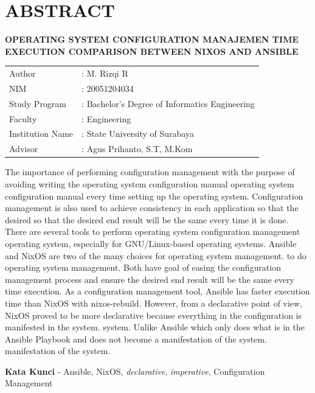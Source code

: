 \documentclass[10pt,]{report}
\begin{document}
\chapter*{ABSTRACT}
\begin{adjustwidth}{0.0cm}{}
  \begin{center}
    \textbf{OPERATING SYSTEM CONFIGURATION MANAJEMEN TIME EXECUTION COMPARISON BETWEEN NIXOS AND ANSIBLE}
  \end{center}
  \medskip
	\begin{adjustwidth}{0.0cm}{}
    \begin{tabular}{@{}ll}
			Author          & : M. Rizqi R        \\
			NIM            & : 20051204034 \\
			Study Program            & : Bachelor's Degree of Informatics Engineering                        \\
			Faculty & : Engineering \\
      Institution Name & : State University of Surabaya \\
      Advisor & : Agus Prihanto, S.T, M.Kom \\
		\end{tabular}
	\end{adjustwidth}
  \medskip

The importance of performing configuration management with
the purpose of avoiding writing the operating system configuration manual
operating system configuration manual every time setting up the operating system.
Configuration management is also used to achieve
consistency in each application so that the desired
so that the desired end result will be the same every time it is done. There are
several tools to perform operating system configuration management
operating system, especially for GNU/Linux-based operating systems.
Ansible and NixOS are two of the many choices for operating system management.
to do operating system management. Both have
goal of easing the configuration management process and
ensure the desired end result will be the same every time
execution. As a configuration management tool, Ansible has
faster execution time than NixOS with nixos-rebuild.
However, from a declarative point of view, NixOS proved to be more declarative
because everything in the configuration is manifested in the system.
system. Unlike Ansible which only does
what is in the Ansible Playbook and does not become a manifestation of the system.
manifestation of the system.

  \medskip

  \noindent\textbf{Kata Kunci} - Ansible, NixOS, \textit{declarative}, \textit{imperative},
  Configuration Management
\end{adjustwidth}
\tableofcontents
\newpage
\listoftables
\newpage
\listoffigures
\end{document}

